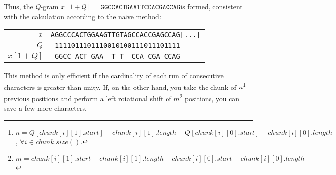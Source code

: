 \begin{example}
	Thus, the $Q$-gram $x[1 + Q] = \texttt{GGCCACTGAATTCCACGACCAG}$is formed, consistent with the calculation according to the naive method:
	\begin{center}
		\begin{tabular}{r || l}
			$x$ & \texttt{AGGCCCACTGGAAGTTGTAGCCACCGAGCCAG[...]} \\
			$Q$ & \texttt{\ 1111011101110010100111011101111} \\
			$x[1 + Q]$ & \texttt{\ GGCC\ ACT\ GAA\ \ T\ T\ \ CCA\ CGA\ CCAG} \\
		\end{tabular}
	\end{center}
\end{example}

This method is only efficient if the cardinality of each run of consecutive characters is greater than unity. If, on the other hand, you take the chunk of $n$\footnote{$n = Q[chunk[i][1].start] + chunk[i][1].length - Q[chunk[i][0].start] - chunk[i][0].length$, $\forall i \in chunk.size()$.} previous positions and perform a left rotational shift of $m$\footnote{$m = chunk[i][1].start + chunk[i][1].length - chunk[i][0].start - chunk[i][0].length$} positions, you can save a few more characters.

